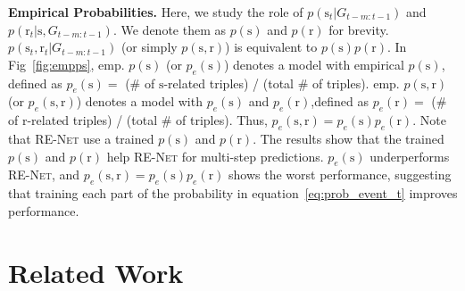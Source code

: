 \documentclass[11pt,a4paper]{article}
\newcommand{\prob}{p}
\newcommand{\calE}{G}
\newcommand{\method}{\textsc{RE-Net}\xspace}
\newcommand{\para}[1]{\smallskip\noindent\textbf{#1}}
\newcommand{\bs}{\mathrm{s}}
\newcommand{\br}{\mathrm{r}}
\begin{document}
\para{Empirical Probabilities.}
Here, we study the role of $\prob(\bs_{t}|\calE_{t-m:t-1})$ and $\prob(\br_{t}|\bs,\calE_{t-m:t-1})$. 
We denote them as $\prob(\bs)$ and $\prob(\br)$ for brevity. 
$\prob(\bs_t, \br_t| \calE_{t-m:t-1})$ (or simply $\prob(\bs, \br)$) is equivalent to $\prob(\bs) \prob(\br)$.
In Fig~\ref{fig:empps}, emp. $\prob(\bs)$ (or $\prob_e(\bs)$) denotes a model with empirical $\prob(\bs)$, defined as $\prob_e(\bs)=$ (\# of $\bs$-related triples) / (total \# of triples). 
emp. $\prob(\bs,\br)$ (or $\prob_e(\bs,\br)$) denotes a model with $\prob_e(\bs)$ and $\prob_e(\br)$,defined as $\prob_e(\br)=$ (\# of $\br$-related triples) / (total \# of triples). Thus, $\prob_e(\bs,\br) = \prob_e(\bs) \prob_e(\br)$. 
Note that \method use a trained $\prob(\bs)$ and $\prob(\br)$.
The results show that the trained $\prob(\bs)$ and $\prob(\br)$ help \method for multi-step predictions. 
$\prob_e(\bs)$ underperforms \method, and $\prob_e(\bs,\br)=\prob_e(\bs) \prob_e(\br)$ shows the worst performance, suggesting that training each part of the probability in equation~\eqref{eq:prob_event_t} improves performance.












\section{Related Work}


\end{document}
